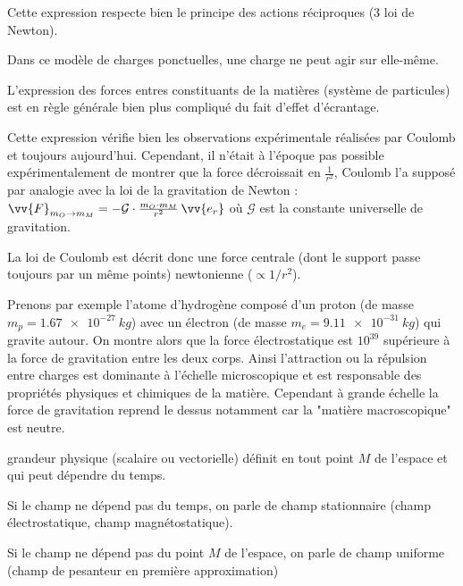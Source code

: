 \documentclass[12pt,fancy]{/Users/victor/Documents/COURS/2ACapECL/texmf/tex/latex/Preambles/cours}
\begin{document}
\begin{liste}
\item Cette expression respecte bien le principe des actions réciproques (3 loi de Newton).
\item Dans ce modèle de charges ponctuelles, une charge ne peut agir sur elle-même.
\item L'expression des forces entres constituants de la matières (système de particules) est en règle générale bien plus compliqué du fait d'effet d'écrantage.
\end{liste}
 
\begin{remarque}
Cette expression vérifie bien les observations expérimentale réalisées par Coulomb et toujours aujourd'hui. Cependant, il n'était à l'époque pas possible expérimentalement de montrer que la force décroissait en $\frac{1}{r^2}$, Coulomb l'a supposé par analogie avec la loi de la gravitation de Newton : $\vv{F}_{m_{O}\rightarrow m_{M}}= -\mathcal{G} \cdot \frac{m_{O} \cdot m_{M}} {r^2}\,\vv{e_r}$ où $\mathcal{G}$ est la constante universelle de gravitation.
\end{remarque}

La loi de Coulomb est décrit donc une force centrale (dont le support passe toujours par un même points) newtonienne ($\propto 1/r^2$).

\begin{odg}
Prenons par exemple l’atome d’hydrogène composé d’un proton (de masse $m_{p} = \SI{1.67e-27}{kg}$) avec un électron (de masse $m_{e} = \SI{9.11e-31}{kg}$) qui gravite autour. On montre alors que la force électrostatique est $10^{39}$ supérieure à la force de gravitation entre les deux corps. Ainsi l’attraction ou la répulsion entre charges est dominante à l’échelle microscopique et est responsable des propriétés physiques et chimiques de la matière. Cependant à grande échelle la force de gravitation reprend le dessus notamment car la "matière macroscopique" est neutre.
\end{odg}

\begin{definition}
 grandeur physique (scalaire ou vectorielle) définit en tout point $M$ de l'espace et qui peut dépendre du temps.
\end{definition}
\begin{remarque}
\begin{liste}
\item Si le champ ne dépend pas du temps, on parle de champ stationnaire (champ électrostatique, champ magnétostatique).
\item Si le champ ne dépend pas du point $M$ de l'espace, on parle de champ uniforme (champ de pesanteur en première approximation)
\end{liste}
\end{remarque}
\end{document}
